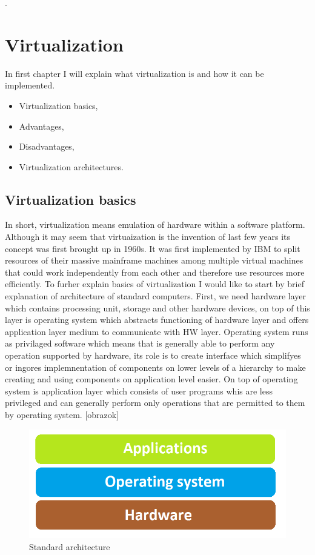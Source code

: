 
.
\chapter{Virtualization}
In first chapter I will explain what virtualization is and how it can be implemented.
\begin{itemize}
\item Virtualization basics,
\item Advantages,
\item Disadvantages,
\item Virtualization architectures.
\end{itemize}

\section{Virtualization basics}
In short, virtualization means emulation of hardware within a software platform. Although it may seem that virtuaization is the invention of last few years its concept was first brought up in 1960s. It was first implemented by IBM to split resources of their massive mainframe machines among multiple virtual machines that could work independently from each other and therefore use resources more efficiently.
To furher explain basics of virtualization I would like to start by brief explanation of architecture of standard computers. First, we need hardware layer which contains processing unit, storage and other hardware devices, on top of this layer is operating system which abstracts functioning of hardware layer and offers application layer medium to communicate with HW layer. Operating system runs as privilaged software which means that is generally able to perform any operation supported by hardware, its role is to create interface which simplifyes or ingores implemnentation of components on lower levels of a hierarchy to make creating and using components on application level easier. On top of operating system is application layer which consists of user programs whis are less privileged and can generally perform only operations that are permitted to them by operating system. [obrazok]

\begin{figure}[H]
\centering
\includegraphics[scale=0.5]{klasika.png}
\caption{Standard architecture}
\end{figure}

